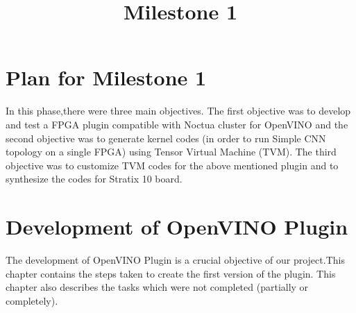 \documentclass[titlepage]{report}
\title{\textbf{Milestone 1}}
\begin{document}
\maketitle

\tableofcontents{}
\newpage

\chapter{Plan for Milestone 1}
In this phase,there were three main objectives. The first objective was to develop and test a FPGA plugin compatible with Noctua cluster for OpenVINO and the second objective was to generate kernel codes (in order to run Simple CNN topology on a single FPGA) using Tensor Virtual Machine (TVM). 
The third objective was to customize TVM codes for the above mentioned plugin and to synthesize the codes for Stratix 10 board.



\chapter{Development of OpenVINO Plugin}
The development of OpenVINO Plugin is a crucial objective of our project.This chapter contains the steps taken to create the first version of the plugin. This chapter also describes the tasks which were not completed (partially or completely). 
\end{document}
